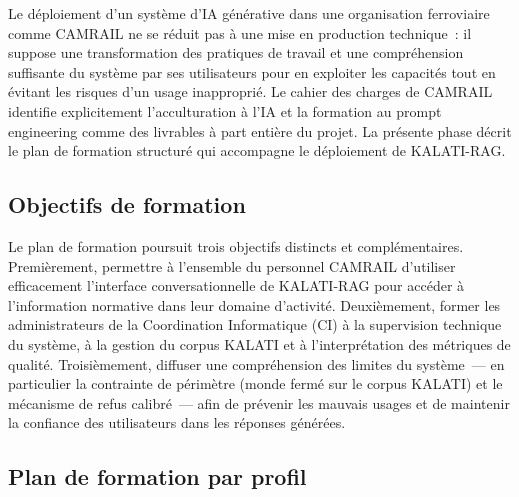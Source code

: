 \documentclass[12pt,a4paper]{report}
\begin{document}
Le déploiement d'un système d'IA générative dans une organisation ferroviaire comme CAMRAIL ne
se réduit pas à une mise en production technique~: il suppose une transformation des pratiques
de travail et une compréhension suffisante du système par ses utilisateurs pour en exploiter les
capacités tout en évitant les risques d'un usage inapproprié. Le cahier des charges de CAMRAIL
identifie explicitement l'acculturation à l'IA et la formation au prompt engineering comme des
livrables à part entière du projet. La présente phase décrit le plan de formation structuré qui
accompagne le déploiement de KALATI-RAG.

\subsection{Objectifs de formation}

Le plan de formation poursuit trois objectifs distincts et complémentaires. Premièrement,
permettre à l'ensemble du personnel CAMRAIL d'utiliser efficacement l'interface conversationnelle
de KALATI-RAG pour accéder à l'information normative dans leur domaine d'activité.
Deuxièmement, former les administrateurs de la Coordination Informatique (CI) à la supervision
technique du système, à la gestion du corpus KALATI et à l'interprétation des métriques de
qualité. Troisièmement, diffuser une compréhension des limites du système~--- en particulier la
contrainte de périmètre (monde fermé sur le corpus KALATI) et le mécanisme de refus calibré~---
afin de prévenir les mauvais usages et de maintenir la confiance des utilisateurs dans les
réponses générées.

\subsection{Plan de formation par profil}
\end{document}
